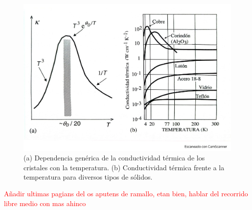 \begin{figure}[h!] \centering
    \includegraphics[scale=0.35]{Cuerpo/Ch_05/Fotos libro 9.pdf}
    \caption{(a) Dependencia genérica de la conductividad térmica de los cristales con la temperatura. (b) Conductividad térmica frente a la temperatura para diversos tipos de sólidos.}
    \label{Fig:05-09}
\end{figure}    


\begin{Anotacion}
	\textcolor{red}{Añadir ultimas pagians del os aputens de ramallo, etan bien, hablar del recorrido libre medio con mas ahinco}
\end{Anotacion}


